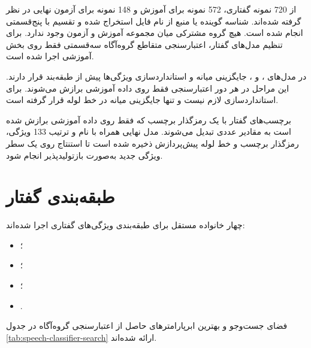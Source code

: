 از 720 نمونه گفتاری، 572 نمونه برای آموزش و 148 نمونه برای آزمون نهایی در نظر گرفته شده‌اند. شناسه گوینده یا منبع از نام فایل استخراج شده و تقسیم با
پنج‌قسمتی انجام شده است. هیچ گروه مشترکی میان مجموعه آموزش و آزمون وجود ندارد. برای تنظیم مدل‌های گفتار، اعتبارسنجی متقاطع گروه‌آگاه سه‌قسمتی فقط روی بخش آموزشی اجرا شده است.

در مدل‌های
،
و
،
جایگزینی میانه و استانداردسازی ویژگی‌ها پیش از طبقه‌بند قرار دارند. این مراحل در هر دور اعتبارسنجی فقط روی داده آموزشی برازش می‌شوند. برای
استانداردسازی لازم نیست و تنها جایگزینی میانه در خط لوله قرار گرفته است.

برچسب‌های گفتار با یک رمزگذار برچسب که فقط روی داده آموزشی برازش شده است به مقادیر عددی تبدیل می‌شوند. مدل نهایی همراه با نام و ترتیب 133 ویژگی، رمزگذار برچسب و خط لوله پیش‌پردازش ذخیره شده است تا استنتاج روی یک سطر ویژگی جدید به‌صورت بازتولیدپذیر انجام شود.


\section{طبقه‌بندی گفتار}

چهار خانواده مستقل برای طبقه‌بندی ویژگی‌های گفتاری اجرا شده‌اند:

\begin{itemize}
	\item {}؛
	\item {}؛
	\item {}؛
	\item {}.
\end{itemize}

فضای جست‌وجو و بهترین ابرپارامترهای حاصل از اعتبارسنجی گروه‌آگاه در جدول
\ref{tab:speech-classifier-search}
ارائه شده‌اند.

